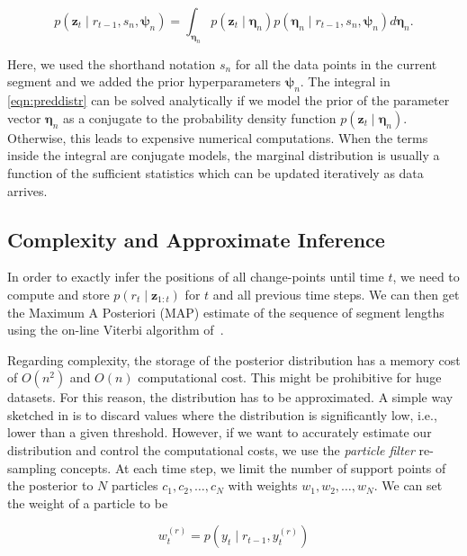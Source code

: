 \begin{equation}
\label{eqn:preddistr}
p(\mathbf{z}_t\mid r_{t-1},s_n,\boldsymbol{\psi}_n)=
\int_{\boldsymbol{\eta}_{n}}p(\mathbf{z}_t\mid \boldsymbol{\eta}_{n})
p(\boldsymbol{\eta}_{n}\mid r_{t-1},s_n,\boldsymbol{\psi}_n)
d\boldsymbol{\eta}_{n}.
\end{equation}

Here, we used the shorthand notation $s_n$ for all the data points in the
current segment and we added the prior hyperparameters $\boldsymbol{\psi}_{n}$.
The integral in \eqref{eqn:preddistr} can be solved
analytically if we model the prior of the parameter vector
$\boldsymbol{\eta}_{n}$ as a conjugate to the probability density function
$p(\mathbf{z}_t\mid \boldsymbol{\eta}_{n})$. Otherwise, this leads to expensive
numerical computations. When the terms inside the integral are conjugate models,
the marginal distribution is usually a function of the sufficient statistics
which can be updated iteratively as data arrives.

\subsection{Complexity and Approximate Inference}
In order to exactly infer the positions of all change-points until time $t$, we
need to compute and store $p(r_t\mid \mathbf{z}_{1:t})$ for $t$ and all previous
time steps. We can then get the Maximum A Posteriori (MAP) estimate of the
sequence of segment lengths using the on-line Viterbi
algorithm of~\cite{fearnhead07online}.

Regarding complexity, the storage of the posterior distribution has a
memory cost of $O(n^2)$ and $O(n)$ computational cost. This might be
prohibitive for huge datasets. For this reason, the distribution has
to be approximated. A simple way sketched in \cite{adams07bayesian} is
to discard values where the distribution is significantly low, i.e.,
lower than a given threshold. However, if we want to accurately
estimate our distribution and control the computational costs, we use
the \emph{particle filter} re-sampling concepts. At each time step, we
limit the number of support points of the posterior to $N$ particles
$c_1,c_2,\dots,c_N$ with weights $w_1,w_2,\dots,w_N$. We can set the
weight of a particle to be

\begin{equation}
\label{eqn:weight}
w_t^{(r)} = p(y_t\mid r_{t-1},y_t^{(r)})
\end{equation}

